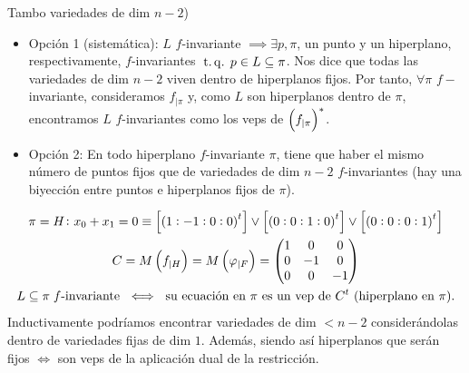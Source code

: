 \begin{obs}
	Tambo variedades de dim $n-2$)
	\begin{itemize}
		\item Opción 1 (sistemática): $L$ $f$-invariante $\implies \exists p,\pi$, un punto y un hiperplano, respectivamente, $f$-invariantes $\operatorname{\;t.q.\;} p\in L\subseteq\pi$. Nos dice que todas las variedades de dim $n-2$ viven dentro de hiperplanos fijos. Por tanto, $\forall \pi$ $f-$invariante, consideramos $f_{|\pi}$ y, como $L$ son hiperplanos dentro de $\pi$, encontramos $L$ $f$-invariantes como los veps de $\left( f_{|\pi}\right)^*$.
		\item Opción 2: En todo hiperplano $f$-invariante $\pi$, tiene que haber el mismo número de puntos fijos que de variedades de dim $n-2$ $f$-invariantes (hay una biyección entre puntos e hiperplanos fijos de $\pi$).
	\end{itemize}
\end{obs}
\begin{example}
	\begin{gather*}
		\pi = H \colon x_0 + x_1 = 0 \equiv \left[\left(1:-1:0:0\right)^t\right] \vee \left[\left(0:0:1:0\right)^t\right] \vee \left[\left(0:0:0:1\right)^t\right] \\
		C = M\left( f_{|H}\right) = M\left(\varphi_{|F}\right) =
		\begin{pmatrix}
			1 & 0 & 0 \\
			0 & -1 & 0 \\
			0 & 0 & -1
		\end{pmatrix} \\
		L \subseteq \pi\;f\text{-invariante }\iff\text{ su ecuación en }\pi\text{ es un vep de }C^t\text{ (hiperplano en }\pi\text{).}
	\end{gather*}
	Inductivamente podríamos encontrar variedades de dim $< n-2$ considerándolas dentro de variedades fijas de dim $1$. Además, siendo así hiperplanos que serán fijos $\iff$ son veps de la aplicación dual de la restricción.
\end{example}
